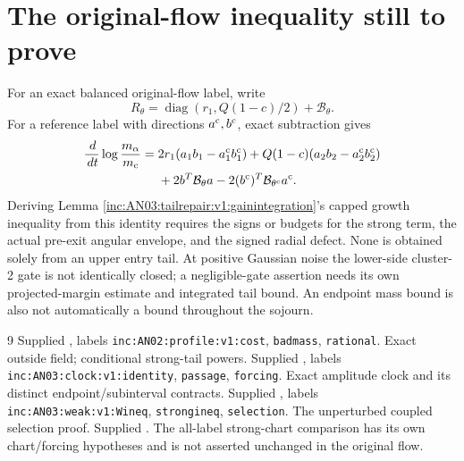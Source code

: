 \documentclass[11pt]{article}
\theoremstyle{remark}\newtheorem{remark}[theorem]{Remark}
\newcommand{\dd}{\,d}\newcommand{\E}{\mathbb E}
\begin{document}
\section{The original-flow inequality still to prove}
For an exact balanced original-flow label, write
\[
 R_\theta=\operatorname{diag}(r_1,Q(1-c)/2)+\mathcal B_\theta.
\]
For a reference label with directions $a^{\rm c},b^{\rm c}$, exact subtraction gives
\begin{align*}
 \frac{\dd}{\dd t}\log\frac{m_\alpha}{m_{\rm c}}
 ={}&2r_1(a_1b_1-a_1^{\rm c}b_1^{\rm c})
 +Q(1-c)(a_2b_2-a_2^{\rm c}b_2^{\rm c})\\
 &+2b^T\mathcal B_\theta a
 -2(b^{\rm c})^T\mathcal B_{\theta^{\rm c}}a^{\rm c}.
\end{align*}
Deriving Lemma \ref{inc:AN03:tailrepair:v1:gainintegration}'s capped growth inequality from this identity requires the signs or budgets for the strong term, the actual pre-exit angular envelope, and the signed radial defect. None is obtained solely from an upper entry tail. At positive Gaussian noise the lower-side cluster-2 gate is not identically closed; a negligible-gate assertion needs its own projected-margin estimate and integrated tail bound. An endpoint mass bound is also not automatically a bound throughout the sojourn.

\begin{thebibliography}{9}\small
{} Supplied , labels \texttt{inc:AN02:profile:v1:cost}, \texttt{badmass}, \texttt{rational}. Exact outside field; conditional strong-tail powers.
 Supplied , labels \texttt{inc:AN03:clock:v1:identity}, \texttt{passage}, \texttt{forcing}. Exact amplitude clock and its distinct endpoint/subinterval contracts.
 Supplied , labels \texttt{inc:AN03:weak:v1:Wineq}, \texttt{strongineq}, \texttt{selection}. The unperturbed coupled selection proof.
 Supplied . The all-label strong-chart comparison has its own chart/forcing hypotheses and is not asserted unchanged in the original flow.
\end{thebibliography}
\end{document}

